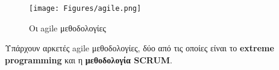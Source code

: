\begin{figure}[th]
    \centering
    \texttt{[image: Figures/agile.png]}
    \caption[Οι agile μεθοδολογίες]{Οι agile μεθοδολογίες}
    \label{fig:rad}
\end{figure}

Υπάρχουν αρκετές agile μεθοδολογίες, δύο από τις οποίες είναι το \textbf{extreme programming} και η \textbf{μεθοδολογία SCRUM}.
